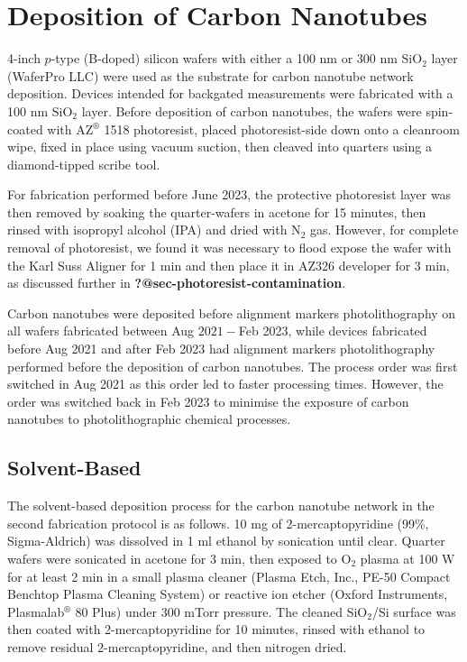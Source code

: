 \documentclass[
  a4paper,
]{scrbook}
\begin{document}
\hypertarget{sec-dep-carbon-nanotubes}{%
\section{Deposition of Carbon
Nanotubes}\label{sec-dep-carbon-nanotubes}}

4-inch \(p\)-type (B-doped) silicon wafers with either a 100 nm or 300
nm SiO\(_2\) layer (WaferPro LLC) were used as the substrate for carbon
nanotube network deposition. Devices intended for backgated measurements
were fabricated with a 100 nm SiO\(_2\) layer. Before deposition of
carbon nanotubes, the wafers were spin-coated with AZ\(^\circledR\) 1518
photoresist, placed photoresist-side down onto a cleanroom wipe, fixed
in place using vacuum suction, then cleaved into quarters using a
diamond-tipped scribe tool.

For fabrication performed before June 2023, the protective photoresist
layer was then removed by soaking the quarter-wafers in acetone for 15
minutes, then rinsed with isopropyl alcohol (IPA) and dried with N\(_2\)
gas. However, for complete removal of photoresist, we found it was
necessary to flood expose the wafer with the Karl Suss Aligner for 1 min
and then place it in AZ326 developer for 3 min, as discussed further in
\textbf{?@sec-photoresist-contamination}.

Carbon nanotubes were deposited before alignment markers
photolithography on all wafers fabricated between Aug \(2021-\)Feb 2023,
while devices fabricated before Aug 2021 and after Feb 2023 had
alignment markers photolithography performed before the deposition of
carbon nanotubes. The process order was first switched in Aug 2021 as
this order led to faster processing times. However, the order was
switched back in Feb 2023 to minimise the exposure of carbon nanotubes
to photolithographic chemical processes.

\hypertarget{solvent-based}{%
\subsection{Solvent-Based}\label{solvent-based}}

The solvent-based deposition process for the carbon nanotube network in
the second fabrication protocol is as follows. 10 mg of
2-mercaptopyridine (99\%, Sigma-Aldrich) was dissolved in 1 ml ethanol
by sonication until clear. Quarter wafers were sonicated in acetone for
3 min, then exposed to O\(_2\) plasma at 100 W for at least 2 min in a
small plasma cleaner (Plasma Etch, Inc., PE-50 Compact Benchtop Plasma
Cleaning System) or reactive ion etcher (Oxford Instruments,
Plasmalab\(^\circledR\) 80 Plus) under 300 mTorr pressure. The cleaned
SiO\(_2\)/Si surface was then coated with 2-mercaptopyridine for 10
minutes, rinsed with ethanol to remove residual \(2\)-mercaptopyridine,
and then nitrogen dried.
\end{document}
